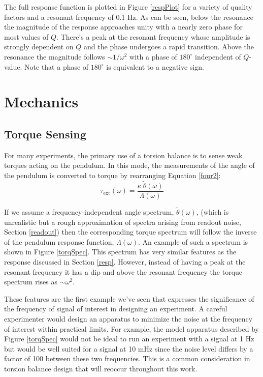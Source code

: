 \documentclass{book}
\begin{document}
The full response function is plotted in Figure \ref{respPlot} for a variety of quality factors and a resonant frequency of 0.1 Hz. As can be seen, below the resonance the magnitude of the response approaches unity with a nearly zero phase for most values of $Q$. There's a peak at the resonant frequency whose amplitude is strongly dependent on $Q$ and the phase undergoes a rapid transition. Above the resonance the magnitude follows $\sim1/\omega^2$ with a phase of $180^\circ$ independent of $Q$-value. Note that a phase of $180^\circ$ is equivalent to a negative sign.


\chapter{Mechanics}
\section{Torque Sensing}

\quad For many experiments, the primary use of a torsion balance is to sense weak torques acting on the pendulum. In this mode, the measurements of the angle of the pendulum is converted to torque by rearranging Equation \ref{four2}:
\begin{equation}
\tau_{\text{ext}} (\omega)= \frac{\kappa\ \tilde{\theta}(\omega)}{\Lambda(\omega)} \label{torq}
\end{equation}

If we assume a frequency-independent angle spectrum, $\tilde{\theta}(\omega)$, (which is unrealistic but a rough approximation of spectra arising from readout noise, Section \ref{readout}) then the corresponding torque spectrum will follow the inverse of the pendulum response function, $\Lambda(\omega)$. An example of such a spectrum is shown in Figure \ref{torqSpec}. This spectrum has very similar features as the response discussed in Section \ref{resp}. However, instead of having a peak at the resonant frequency it has a dip and above the resonant frequency the torque spectrum rises as $\sim \omega^2$. 

These features are the first example we've seen that expresses the significance of the frequency of signal of interest in designing an experiment. A careful experimenter would design an apparatus to minimize the noise at the frequency of interest within practical limits. For example, the model apparatus described by Figure \ref{torqSpec} would not be ideal to run an experiment with a signal at 1 Hz but would be well suited for a signal at 10 mHz since the noise level differs by a factor of 100 between these two frequencies. This is a common consideration in torsion balance design that will reoccur throughout this work.
\end{document}
